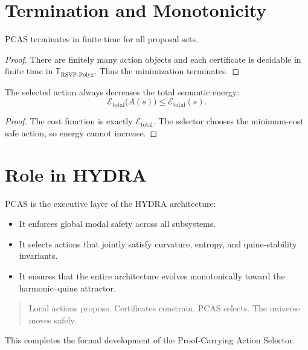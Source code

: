 \section{Termination and Monotonicity}

\begin{theorem}[Totality]
PCAS terminates in finite time for all proposal sets.
\end{theorem}

\begin{proof}
There are finitely many action objects and each certificate is decidable in
finite time in $\mathbb{T}_{\mathrm{RSVP\text{-}Polyx}}$.  
Thus the minimization terminates.
\end{proof}

\begin{theorem}
The selected action always decreases the total semantic energy:
\[
\mathcal{E}_{\mathrm{total}}\bigl(A(s)\bigr)
  \le
\mathcal{E}_{\mathrm{total}}(s).
\]
\end{theorem}

\begin{proof}
The cost function is exactly $\mathcal{E}_{\mathrm{total}}$.
The selector chooses the minimum-cost safe action, so energy cannot increase.
\end{proof}

\section{Role in HYDRA}

PCAS is the executive layer of the HYDRA architecture:
\begin{itemize}
\item It enforces global modal safety across all subsystems.
\item It selects actions that jointly satisfy curvature, entropy, and
      quine-stability invariants.
\item It ensures that the entire architecture evolves monotonically toward the
      harmonic--quine attractor.
\end{itemize}

\begin{quote}
Local actions propose.  
Certificates constrain.  
PCAS selects.  
The universe moves safely.
\end{quote}

This completes the formal development of the Proof-Carrying Action Selector.


